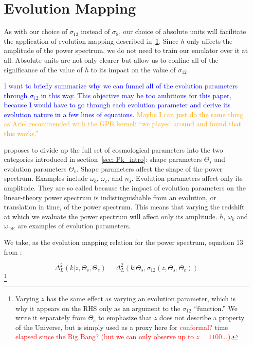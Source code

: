 \section{Evolution Mapping}
\label{sec: ev_mapping_intro}

As with our choice of $\sigma_{12}$ instead of $\sigma_8$, our choice of
absolute units will facilitate the application of evolution mapping described
in~\ref{sec: ev_mapping_intro}. Since $h$ only affects the amplitude of the
power spectrum, we do not need to train our emulator over it at all. Absolute 
units are not only clearer but allow us to confine all of the significance of
the value of $h$ to its impact on the value of $\sigma_{12}$.

\textcolor{blue}{I want to briefly summarize why we can funnel all of the 
evolution parameters through $\sigma_{12}$ in this way. This objective may be
too ambitious for this paper, because I would have to go through each
evolution parameter and derive its evolution nature in a few lines of 
equations.} \textcolor{orange}{Maybe I can just do the same thing as Ariel
recommended with the GPR kernel: ``we played around and found that this
works.''}

\citet{San21} proposes to divide up the full set of cosmological
parameters into the two categories introduced in section~\ref{sec: Pk_intro}: 
shape parameters $\Theta_s$ and evolution parameters $\Theta_e$.
Shape parameters affect the shape of the power spectrum. Examples include
$\omega_b$, $\omega_c$, and $n_s$.
Evolution parameters affect only its amplitude. They are so called because
the impact of evolution parameters on the linear-theory power spectrum is
indistinguishable from an evolution, or translation in time, of the power 
spectrum. This means that varying the redshift at which we evaluate the power
spectrum will affect only its amplitude. $h$, $\omega_k$ and
$\omega_\text{DE}$ are examples of evolution parameters. 

We take, as the evolution mapping relation for the power spectrum, equation 13
from \citet{San21}:

\begin{equation}
\label{eq: evMapping_pSpectrum}
    \Delta^2_L (k | z, \Theta_s, \Theta_e)
    =
    \Delta_L^2 (k | \Theta_s, \sigma_{12} \left( z, \Theta_s, \Theta_e \right))
\end{equation}\footnote{Varying $z$ has the same effect as varying an
evolution parameter, which is why it appears on the RHS only as an argument to
the $\sigma_{12}$ ``function.'' We write it separately from $\Theta_e$ to
emphasize that $z$ does not describe a property of the Universe, but is
simply used as a proxy here for \textcolor{red}{conformal?} time
\textcolor{red}{elapsed since the Big Bang? (but we can only observe up to
$z = 1100$...)}.}

